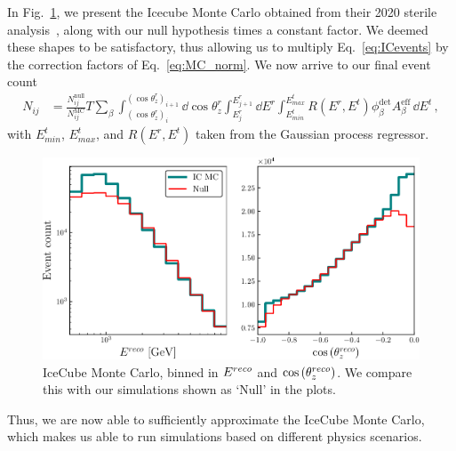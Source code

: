 In Fig.~\ref{fig:IC_MC_norm}, we present the Icecube Monte Carlo obtained from their 2020 sterile analysis~\cite{IC2020}, along
with our null hypothesis times a constant factor.  We deemed these shapes to be satisfactory, thus allowing us to multiply Eq.~\ref{eq:ICevents} by the 
correction factors of Eq.~\ref{eq:MC_norm}. We now arrive to our final event count
\begin{align}\label{eq:Nth}
    N_{ij} &= \frac{N_{ij}^\text{null}}{N_{ij}^\text{MC}} T \sum_\beta \int_{(\cos{\theta_z^r})_i}^{(\cos{\theta_z^r})_{i+1}} \dd \cos{\theta^r_z} \int_{E^r_{j}}^{E^r_{j+1}} \dd E^r 
    \int_{E^t_{min}}^{E^t_{max}} R(E^r,E^t) \phi_\beta^\text{det}  A^\text{eff}_\beta\, \dd E^t
    \,,
\end{align}
with $E^t_{min}$, $E^t_{max}$, and $R(E^r,E^t)$ taken from the Gaussian process regressor.
\begin{figure}[ht]
    \begin{centering}
    \includegraphics[scale=0.8]{figures/IC_MC_norm.pdf}
    \caption{IceCube Monte Carlo, binned in $E^{reco}$ and $\cos{(\theta_z^{reco})}$. We compare this with our simulations shown as `Null' in the plots.}\label{fig:IC_MC_norm}
    \end{centering}
\end{figure} 
Thus, we are now able to sufficiently approximate the IceCube Monte Carlo, which makes us able to run simulations based on different physics scenarios.
% 
% 
% 